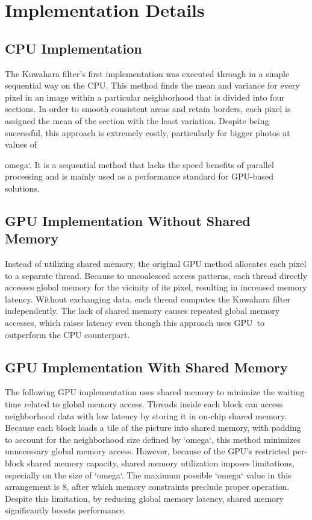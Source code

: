 \documentclass{article}
\begin{document}
\section{Implementation Details}

\subsection{CPU Implementation}
The Kuwahara filter's first implementation was executed through in a simple sequential way on the CPU. This method finds the mean and variance for every pixel in an image within a particular neighborhood that is divided into four sections. In order to smooth consistent areas and retain borders, each pixel is assigned the mean of the section with the least variation. Despite being successful, this approach is extremely costly, particularly for bigger photos at values of {omega`. It is a sequential method that lacks the speed benefits of parallel processing and is mainly used as a performance standard for GPU-based solutions.

\subsection{GPU Implementation Without Shared Memory}
Instead of utilizing shared memory, the original GPU method allocates each pixel to a separate thread. Because to uncoalesced access patterns, each thread directly accesses global memory for the vicinity of its pixel, resulting in increased memory latency. Without exchanging data, each thread computes the Kuwahara filter independently. The lack of shared memory causes repeated global memory accesses, which raises latency even though this approach uses GPU to outperform the CPU counterpart.

\subsection{GPU Implementation With Shared Memory}
The following GPU implementation uses shared memory to minimize the waiting time related to global memory access. Threads inside each block can access neighborhood data with low latency by storing it in on-chip shared memory. Because each block loads a tile of the picture into shared memory, with padding to account for the neighborhood size defined by `omega`, this method minimizes unnecessary global memory access. However, because of the GPU's restricted per-block shared memory capacity, shared memory utilization imposes limitations, especially on the size of `omega`. The maximum possible `omega` value in this arrangement is 8, after which memory constraints preclude proper operation. Despite this limitation, by reducing global memory latency, shared memory significantly boosts performance.

}
\end{document}
